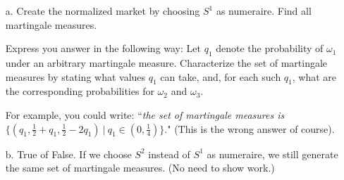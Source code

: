 \documentclass[12pt]{article}
\renewcommand{\o}{\omega}
\newcommand{\ol}{\overline}
\begin{document}
\begin{enumerate}
\begin{itemize}
  \item[a.] Create the normalized market by choosing $S^1$ as numeraire. Find all martingale measures. 
  
  Express you answer in the following way: Let $q_1$ denote the probability of $\o_1$ under an arbitrary martingale measure. Characterize the set of martingale measures by stating what values $q_1$ can take, and, for each such $q_1$, what are the corresponding probabilities for $\o_2$ and $\o_3$.
  
  For example, you could write: ``\textit{the set of martingale measures is} $\{(q_1, \frac{1}{2} + q_1, \frac{1}{2} - 2 q_1)\ \vert\ q_1 \in (0, \frac{1}{4})\}$." (This is the wrong answer of course).

\begin{comment}  
  \textit{Solution}: The normalized market is
  \begin{align*}
  \ol{Z} = \begin{bmatrix}
  1	& 1	& 1	& 1\\
  2	& 4	& 2	& 1
  \end{bmatrix}
  \end{align*}
  Let $(q_1, q_2, q_3)$ be a martingale measure. The conditions on the $q$'s are: $q_i \in (0, 1)$ for all $i$, $1 = q_1 + q_2 + q_3$, and $2 = 4 q_1 + 2 q_2 + q_3$.
  
  This yields the condition $1 = 3 q_1 + q_2$ or, equivalently, $q_2 = 1 - 3 q_1$. Thus, the set of martingale measures is $\{(q_1, 1 - 3 q_1, 2 q_1)\ \vert\ q_1 \in (0, \frac{1}{3})\}$.
\end{comment}
  
  \item[b.] True of False. If we choose $S^2$ instead of $S^1$ as numeraire, we still generate the same set of martingale measures. (No need to show work.)
  
\begin{comment}
  \textit{Solution}: False. The normalized market with $S^2$ as numeraire is
  \begin{align*}
  \ol{Z} = \begin{bmatrix}
  \frac{1}{2}	& \frac{1}{4}	& \frac{1}{2}	& 1\\
  1			& 1			& 1			& 1
  \end{bmatrix}
  \end{align*}
  The probability $(\frac{1}{4}, \frac{1}{4}, \frac{1}{2})$ is a martingale measure when $S^1$ is numeraire, but not when $S^2$ is numeraire.
\end{comment}


\end{itemize}
\end{enumerate}
\end{document}
